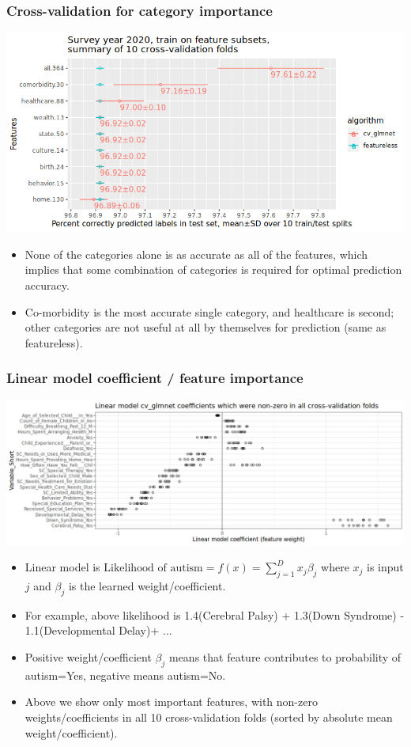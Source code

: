 \documentclass{beamer}
\begin{document}
\begin{frame}
  \frametitle{Cross-validation for category importance}
  \includegraphics[width=\textwidth]{download-nsch-mlr3batchmark-registry-one-set-compare-features.png}

  \begin{itemize}
  \item None of the categories alone is as accurate as all of the
    features, which implies that some combination of categories is
    required for optimal prediction accuracy.
  \item Co-morbidity is the most accurate single category, and
    healthcare is second; other categories are not useful at all by
    themselves for prediction (same as featureless).
  \end{itemize}

\end{frame}

\begin{frame}
  \frametitle{Linear model coefficient / feature importance}
  \includegraphics[width=\textwidth]{download-nsch-mlr3batchmark-registry-glmnet-coef-all.png}

  \begin{itemize}
  \item Linear model is
    $\text{Likelihood of autism} = f(x) = \sum_{j=1}^D x_j \beta_j$
    where $x_j$ is input $j$ and $\beta_j$ is the learned weight/coefficient.
  \item For example, above likelihood is 1.4(Cerebral Palsy) + 1.3(Down Syndrome) - 1.1(Developmental Delay)+ ...
  \item Positive weight/coefficient $\beta_j$ means that feature
    contributes to probability of autism=Yes, negative means
    autism=No.
  \item Above we show only most important features, with non-zero
    weights/coefficients in all 10 cross-validation folds (sorted by
    absolute mean weight/coefficient).
  \end{itemize}

\end{frame}
\end{document}
